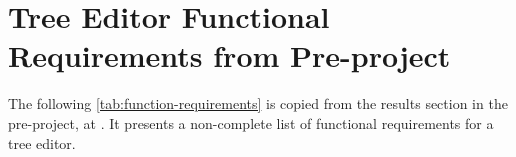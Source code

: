 \chapter{Tree Editor Functional Requirements from Pre-project}\label{app:functional-requirements}

The following \cref{tab:function-requirements} is copied from the results section in the pre-project, at \cite[p.~47-48]{rekstadModelingEnvironmentCloud2020}.
It presents a non-complete list of functional requirements for a tree editor.

